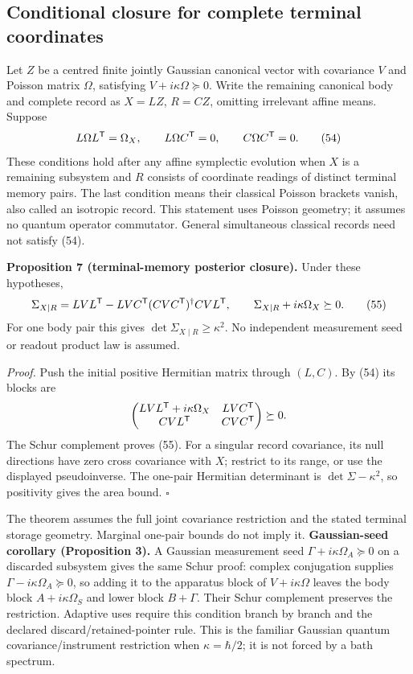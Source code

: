 \documentclass[11pt,a4paper]{article}
\begin{document}
\hypertarget{conditional-closure-for-complete-terminal-coordinates}{%
\subsection{Conditional closure for complete terminal
coordinates}\label{conditional-closure-for-complete-terminal-coordinates}}

Let \(Z\) be a centred finite jointly Gaussian canonical vector with
covariance \(V\) and Poisson matrix \(\Omega\), satisfying
\(V+i\kappa\Omega\succeq0\). Write the remaining canonical body and
complete record as \(X=LZ\), \(R=CZ\), omitting irrelevant affine means.
Suppose \[L\Omega L^{\sf T}=\Omega_X,\qquad
L\Omega C^{\sf T}=0,\qquad C\Omega C^{\sf T}=0.
\tag{54}\] These conditions hold after any affine symplectic evolution
when \(X\) is a remaining subsystem and \(R\) consists of coordinate
readings of distinct terminal memory pairs. The last condition means
their classical Poisson brackets vanish, also called an isotropic
record. This statement uses Poisson geometry; it assumes no quantum
operator commutator. General simultaneous classical records need not
satisfy (54).

\textbf{Proposition 7 (terminal-memory posterior closure).} Under these
hypotheses, \[\Sigma_{X\mid R}
=LVL^{\sf T}-LVC^{\sf T}(CVC^{\sf T})^\dagger CVL^{\sf T},
\qquad\Sigma_{X\mid R}+i\kappa\Omega_X\succeq0.
\tag{55}\] For one body pair this gives
\(\det\Sigma_{X\mid R}\ge\kappa^2\). No independent measurement seed or
readout product law is assumed.

\emph{Proof.} Push the initial positive Hermitian matrix through
\((L,C)\). By (54) its blocks are \[\begin{pmatrix}
LVL^{\sf T}+i\kappa\Omega_X&LVC^{\sf T}\\
CVL^{\sf T}&CVC^{\sf T}
\end{pmatrix}\succeq0.\] The Schur complement proves (55). For a
singular record covariance, its null directions have zero cross
covariance with \(X\); restrict to its range, or use the displayed
pseudoinverse. The one-pair Hermitian determinant is
\(\det\Sigma-\kappa^2\), so positivity gives the area bound. \(\square\)

The theorem assumes the full joint covariance restriction and the stated
terminal storage geometry. Marginal one-pair bounds do not imply it.
\textbf{Gaussian-seed corollary (Proposition 3).} A Gaussian measurement
seed \(\Gamma+i\kappa\Omega_A\succeq0\) on a discarded subsystem gives
the same Schur proof: complex conjugation supplies
\(\Gamma-i\kappa\Omega_A\succeq0\), so adding it to the apparatus block
of \(V+i\kappa\Omega\) leaves the body block \(A+i\kappa\Omega_S\) and
lower block \(B+\Gamma\). Their Schur complement preserves the
restriction. Adaptive uses require this condition branch by branch and
the declared discard/retained-pointer rule. This is the familiar
Gaussian quantum covariance/instrument restriction when
\(\kappa=\hbar/2\); it is not forced by a bath spectrum.
\end{document}
